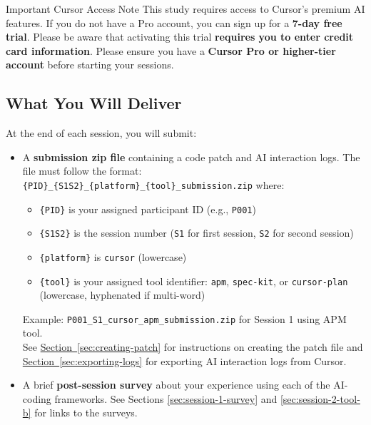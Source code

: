 \documentclass[11pt, a4paper]{article}
\begin{document}
\newpage

\begin{mainbox}{Important Cursor Access Note}
    This study requires access to Cursor's premium AI features. If you do not have a Pro account, you can sign up for a \textbf{7-day free trial}. Please be aware that activating this trial \textbf{requires you to enter credit card information}.
    \newline\newline
    Please ensure you have a \textbf{Cursor Pro or higher-tier account} before starting your sessions.
\end{mainbox}

\subsection{What You Will Deliver}
At the end of each session, you will submit:
\begin{itemize}
    \item A \textbf{submission zip file} containing a code patch and AI interaction logs. The file must follow the format: \texttt{\{PID\}\_\{S1\textbar{}S2\}\_\{platform\}\_\{tool\}\_submission.zip} where:
    \begin{itemize}
        \item \texttt{\{PID\}} is your assigned participant ID (e.g., \texttt{P001})
        \item \texttt{\{S1\textbar{}S2\}} is the session number (\texttt{S1} for first session, \texttt{S2} for second session)
        \item \texttt{\{platform\}} is \texttt{cursor} (lowercase)
        \item \texttt{\{tool\}} is your assigned tool identifier: \texttt{apm}, \texttt{spec-kit}, or \texttt{cursor-plan} (lowercase, hyphenated if multi-word)
    \end{itemize}
    Example: \texttt{P001\_S1\_cursor\_apm\_submission.zip} for Session 1 using APM tool.\\
    See \hyperref[sec:creating-patch]{Section~\ref*{sec:creating-patch}} for instructions on creating the patch file and \hyperref[sec:exporting-logs]{Section~\ref*{sec:exporting-logs}} for exporting AI interaction logs from Cursor.
    \item A brief \textbf{post-session survey} about your experience using each of the AI-coding frameworks.
    See Sections \hyperref[sec:session-1-survey]{\ref*{sec:session-1-survey}} and \hyperref[sec:session-2-tool-b]{\ref*{sec:session-2-tool-b}} for links to the surveys.
\end{itemize}
\end{document}
